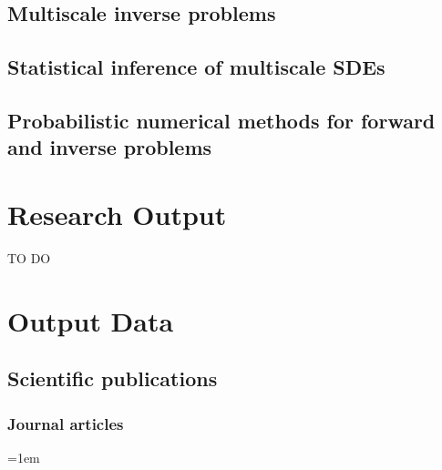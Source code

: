 \documentclass[10pt]{article}
\begin{document}
\subsection{Multiscale inverse problems}\label{sec:AndreaDB}

\subsection{Statistical inference of multiscale SDEs}\label{sec:AndreaZ}

\subsection{Probabilistic numerical methods for forward and inverse problems}\label{sec:Giacomo}


\section{Research Output}
{\color{red} TO DO}




\clearpage
\section{Output Data}

\subsection{Scientific publications}

\subsubsection*{Journal articles}

\sloppy
\emergencystretch=1em
\begin{enumerate}[label={[\arabic*]}]
	\item {}
	\item {}
	\item {}
	\item {}
	\item {}
	\item {}
	\item {}
	\item {}
	\item {}
	\item {}
	\item {}
\end{enumerate}
\end{document}
